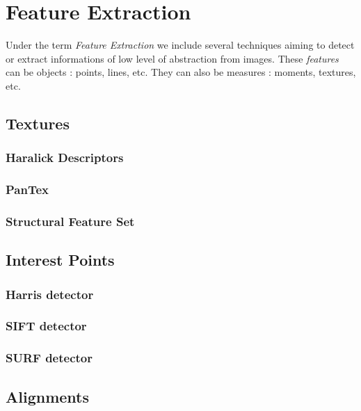 \chapter{Feature Extraction}


Under the term {\em Feature Extraction} we include several techniques
aiming to detect or extract informations of low level of abstraction
from images. These {\em features} can be objects : points, lines,
etc. They can also be measures : moments, textures, etc.

\section{Textures}
\subsection{Haralick Descriptors}


\subsection{PanTex}


\subsection{Structural Feature Set}


\section{Interest Points}
\subsection{Harris detector}

\subsection{SIFT detector}
\label{sec:SIFTDetector}

\subsection{SURF detector}


\section{Alignments}
\label{sec:Alignments}

